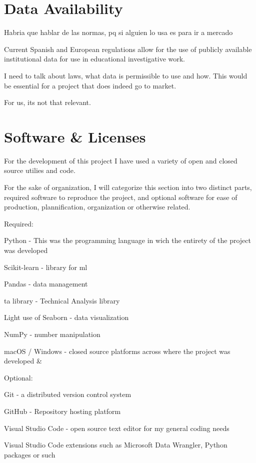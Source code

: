 \documentclass[12pt]{report} %
\begin{document}
\section{Data Availability}
Habria que hablar de las normas, pq si alguien lo usa es para ir a mercado

Current Spanish and European regulations allow for the use of publicly available institutional data for use in educational investigative work.

I need to talk about laws, what data is permissible to use and how. This would be essential for a project that does indeed go to market.

For us, its not that relevant.


\section{Software \& Licenses}

For the development of this project I have used a variety of open and closed source utilies and code.

For the sake of organization, I will categorize this section into two distinct parts, required software to reproduce the project, and optional software for ease of production, plannification, organization or otherwise related.

Required:

Python - This was the programming language in wich the entirety of the project was developed \cite{python}

Scikit-learn - library for ml \cite{scikit-learn}

Pandas - data management \cite{pandas}

ta library - Technical Analysis library\cite{ta-lib}

Light use of Seaborn - data visualization \cite{seaborn}

NumPy - number manipulation \cite{numpy}

macOS / Windows - closed source platforms across where the project was developed \cite{macos} \& \cite{windows}

Optional:

Git - a distributed version control system \cite{git}

GitHub - Repository hosting platform \cite{github}

Visual Studio Code - open source text editor for my general coding needs \cite{vscode}

Visual Studio Code extensions such as Microsoft Data Wrangler, Python packages or such
\end{document}
